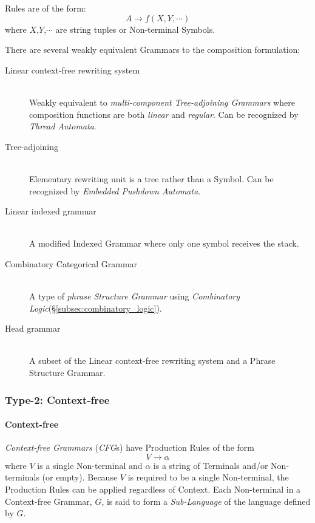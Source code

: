 \documentclass{article}
\begin{document}
Rules are of the form:
\[
    A \rightarrow f(X,Y,\cdots)
\]
where $X$,$Y$,$\cdots$ are string tuples or Non-terminal Symbols.

There are several weakly equivalent Grammars to the composition
formulation:

\begin{description}
\item[Linear context-free rewriting system] \hfill \\
    Weakly equivalent to \emph{multi-component Tree-adjoining
      Grammars} where composition functions are both \emph{linear} and
    \emph{regular}. Can be recognized by \emph{Thread
      Automata}\cite{villemonte02}.

\item[Tree-adjoining] \hfill \\
    Elementary rewriting unit is a tree rather than a Symbol. Can be
    recognized by \emph{Embedded Pushdown
      Automata}\cite{vijayashanker88}.

\item[Linear indexed grammar] \hfill \\
    A modified Indexed Grammar where only one symbol receives the
    stack.

\item[Combinatory Categorical Grammar] \hfill \\
    A type of \emph{phrase Structure Grammar} using \emph{Combinatory
      Logic}(\S\ref{subsec:combinatory_logic}).

\item[Head grammar] \hfill \\
    A subset of the Linear context-free rewriting system and a Phrase
    Structure Grammar.

\end{description}

\subsubsection{Type-2: Context-free}\label{subsec:context_free_language}

\paragraph{Context-free}
\emph{Context-free Grammars} (\emph{CFG}s) have Production Rules of the form
\[
    V \rightarrow \alpha
\]
where $V$ is a single Non-terminal and $\alpha$ is a string of Terminals
and/or Non-terminals (or empty). Because $V$ is required to be a
single Non-terminal, the Production Rules can be applied regardless of
Context. Each Non-terminal in a Context-free Grammar, $G$, is said to
form a \emph{Sub-Language} of the language defined by $G$.
\end{document}
